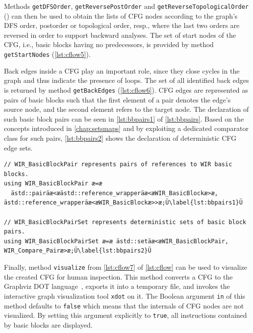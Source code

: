 Methods \texttt{getDFSOrder}, \texttt{getReversePostOrder} and \texttt{getReverseTopologicalOrder} () can then be used to obtain the lists of \gls{CFG} nodes according to the graph's DFS order, postorder or topological order, resp., where the last two orders are reversed in order to support backward analyses.
The set of start nodes of the \gls{CFG}, i.e., basic blocks having no predecessors, is provided by method \texttt{getStartNodes} (\cref{lst:cflow5}).

Back edges inside a \gls{CFG} play an important role, since they close cycles in the graph and thus indicate the presence of loops.
The set of all identified back edges is returned by method \texttt{getBackEdges} (\cref{lst:cflow6}).
\gls{CFG} edges are represented as pairs of basic blocks such that the first element of a pair denotes the edge's source node, and the second element refers to the target node.
The declaration of such basic block pairs can be seen in \cref{lst:bbpairs1} of \cref{lst:bbpairs}.
Based on the concepts introduced in \cref{chap:setsmaps} and by exploiting a dedicated comparator class for such pairs, \cref{lst:bbpairs2} shows the declaration of deterministic \gls{CFG} edge sets.

\begin{lstlisting}[style=code,float=t,caption={Declaration of Basic Block Pairs in file \texttt{wirtypes.h}},label=lst:bbpairs]
// WIR_BasicBlockPair represents pairs of references to WIR basic blocks.
using WIR_BasicBlockPair æ=æ
  ästd::pairäæ<æästd::reference_wrapperäæ<æWIR_BasicBlockæ>æ, ästd::reference_wrapperäæ<æWIR_BasicBlockæ>>æ;Ü\label{lst:bbpairs1}Ü

// WIR_BasicBlockPairSet represents deterministic sets of basic block pairs.
using WIR_BasicBlockPairSet æ=æ ästd::setäæ<æWIR_BasicBlockPair, WIR_Compare_Pairæ>æ;Ü\label{lst:bbpairs2}Ü
\end{lstlisting}

Finally, method \texttt{visualize} from \cref{lst:cflow7} of \cref{lst:cflow} can be used to visualize the created \gls{CFG} for human inspection.
This method converts a \gls{CFG} to the Graphviz DOT language~\cite{dot26}, exports it into a temporary file, and invokes the interactive graph visualization tool \texttt{xdot} on it.
The Boolean argument \texttt{in} of this method defaults to \texttt{false} which means that the internals of \gls{CFG} nodes are not visualized.
By setting this argument explicitly to \texttt{true}, all instructions contained by basic blocks are displayed.


